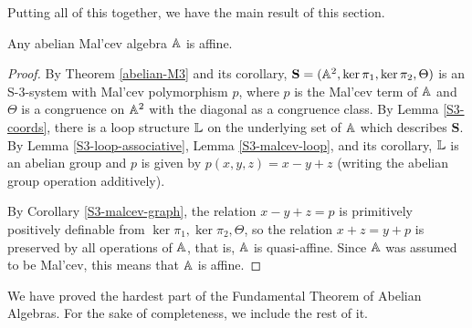 \documentclass[letterpaper,11pt]{article}
\begin{document}
Putting all of this together, we have the main result of this section.

\begin{thm}\label{abelian-malcev} Any abelian Mal'cev algebra $\mathbb{A}$ is affine.
\end{thm}
\begin{proof} By Theorem \ref{abelian-M3} and its corollary, $\mathbf{S} = (\mathbb{A}^2, \ker \pi_1, \ker \pi_2, \Theta)$ is an S-3-system with Mal'cev polymorphism $p$, where $p$ is the Mal'cev term of $\mathbb{A}$ and $\Theta$ is a congruence on $\mathbb{A}^2$ with the diagonal as a congruence class. By Lemma \ref{S3-coords}, there is a loop structure $\mathbb{L}$ on the underlying set of $\mathbb{A}$ which describes $\mathbf{S}$. By Lemma \ref{S3-loop-associative}, Lemma \ref{S3-malcev-loop}, and its corollary, $\mathbb{L}$ is an abelian group and $p$ is given by $p(x,y,z) = x-y+z$ (writing the abelian group operation additively).

By Corollary \ref{S3-malcev-graph}, the relation $x-y+z=p$ is primitively positively definable from $\ker \pi_1, \ker \pi_2, \Theta$, so the relation $x+z = y+p$ is preserved by all operations of $\mathbb{A}$, that is, $\mathbb{A}$ is quasi-affine. Since $\mathbb{A}$ was assumed to be Mal'cev, this means that $\mathbb{A}$ is affine.
\end{proof}

We have proved the hardest part of the Fundamental Theorem of Abelian Algebras. For the sake of completeness, we include the rest of it.
\end{document}
